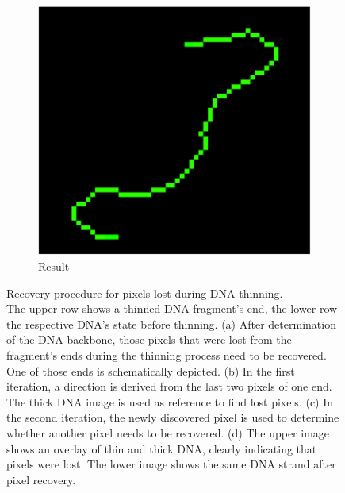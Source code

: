 \documentclass{article}
\begin{document}
\begin{figure}[htb!]
\begin{subfigure}{0.20\textwidth}
		\includegraphics[width=\linewidth]{thin_after_recovery.png}
		\caption{Result}
		\label{fig:end_pixel_recovery4}
	\end{subfigure}
	\caption{Recovery procedure for pixels lost during DNA thinning.\\
		The upper row shows a thinned DNA fragment's end, the lower row the respective DNA's state before thinning. (a) After determination of the DNA backbone, those pixels that were lost from the fragment's ends during the thinning process need to be recovered. One of those ends is schematically depicted. (b) In the first iteration, a direction is derived from the last two pixels of one end. The thick DNA image is used as reference to find lost pixels. (c) In the second iteration, the newly discovered pixel is used to determine whether another pixel needs to be recovered. (d) The upper image shows an overlay of thin and thick DNA, clearly indicating that pixels were lost. The lower image shows the same DNA strand after pixel recovery. 
	}
	\label{fig:end_pixel_recovery}
\end{figure}
\end{document}
